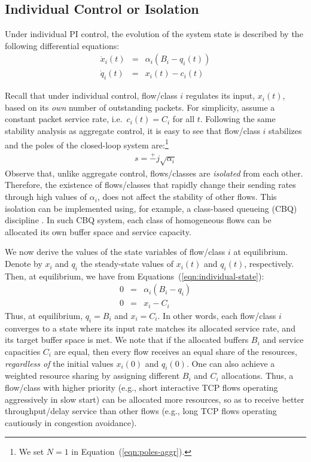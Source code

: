 \documentclass{article}
\begin{document}
\subsection{Individual Control or Isolation}
\label{sec:individual-control}

Under individual PI control,
the evolution of the system state is described by the following
differential equations:
\begin{eqnarray}
\dot{x}_i(t) &=&  \alpha_i (B_i-q_i(t))  \nonumber \\ 
\dot{q}_i(t) &=&  x_i(t) - c_i(t) 
\label{eqn:individual-state}
\end{eqnarray}

Recall that under individual control,
flow/class $i$ regulates its input, $x_i(t)$,
based on its {\em own} number of outstanding packets.
For simplicity,
assume a constant packet service rate,
i.e.\ $c_i(t) = C_i$ for all $t$.
Following the same stability analysis as aggregate control,
it is easy to see that flow/class $i$ stabilizes and
the poles of the closed-loop system are:\footnote{
We set $N = 1$ in Equation~(\ref{eqn:poles-aggr}).}
\begin{eqnarray*}
	s = \stackrel{+}{-} j \sqrt{\alpha_i}
\label{eqn:individual-stability}
\end{eqnarray*}
Observe that, unlike aggregate control,
flows/classes are {\em isolated} from each other.
Therefore, 
the existence of flows/classes that
rapidly change their sending rates
through high values of $\alpha_i$, 
does not affect the stability of other flows.
This isolation can be implemented using,
for example, a class-based queueing (CBQ) discipline \cite{cbq:1995}.
In such CBQ system,
each class of homogeneous flows can be allocated
its own buffer space and service capacity.

We now derive the values of the state variables
of flow/class $i$
at equilibrium.
Denote by $x_i$ and
$q_i$ the steady-state values
of $x_i(t)$ and $q_i(t)$, respectively.
Then, at equilibrium, we have from Equations~(\ref{eqn:individual-state}):
\begin{eqnarray*}
0 &=& \alpha_i (B_i-q_i) \nonumber \\ 
0 &=&  x_i - C_i
\end{eqnarray*}
Thus, at equilibrium, $q_i = B_i$ and $x_i = C_i$.
In other words,
each flow/class $i$ converges to a state where
its input rate matches its allocated service rate,
and its target buffer space is met.
We note that 
if the allocated buffers $B_i$ and 
service capacities $C_i$ are equal,
then every flow receives an equal share
of the resources,
{\em regardless of} the initial values 
$x_i(0)$ and $q_i(0)$.
One can also achieve a weighted resource sharing
by assigning different $B_i$ and $C_i$ allocations.
Thus, a flow/class with higher priority
(e.g., short interactive TCP flows operating aggressively in slow start)
can be allocated more resources,
so as to receive better throughput/delay service
than other flows (e.g., long TCP flows operating cautiously in congestion avoidance).
\end{document}
